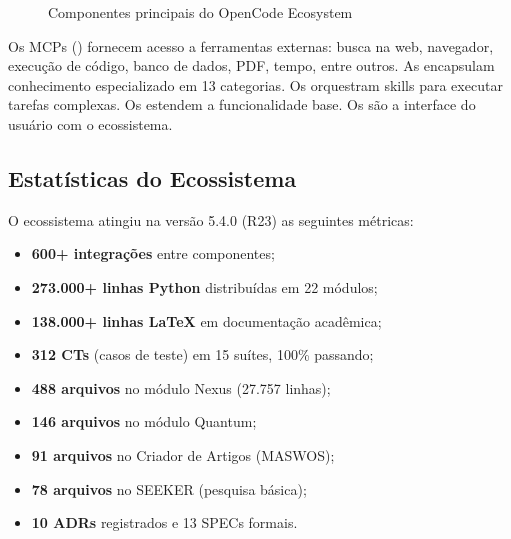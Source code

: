 \begin{figure}[htb]
\centering
\caption{Componentes principais do OpenCode Ecosystem}
\label{fig:componentes-ecossistema}
\end{figure}

Os MCPs () fornecem acesso a ferramentas
externas: busca na web, navegador, execução de código, banco de dados,
PDF, tempo, entre outros. As  encapsulam conhecimento
especializado em 13 categorias. Os  orquestram skills
para executar tarefas complexas. Os  estendem a
funcionalidade base. Os  são a interface do usuário
com o ecossistema.

\subsection{Estatísticas do Ecossistema}
\label{subsec:estatisticas}

O ecossistema atingiu na versão 5.4.0 (R23) as seguintes métricas:

\begin{itemize}
\item \textbf{600+ integrações} entre componentes;
\item \textbf{273.000+ linhas Python} distribuídas em 22 módulos;
\item \textbf{138.000+ linhas LaTeX} em documentação acadêmica;
\item \textbf{312 CTs} (casos de teste) em 15 suítes, 100\% passando;
\item \textbf{488 arquivos} no módulo Nexus (27.757 linhas);
\item \textbf{146 arquivos} no módulo Quantum;
\item \textbf{91 arquivos} no Criador de Artigos (MASWOS);
\item \textbf{78 arquivos} no SEEKER (pesquisa básica);
\item \textbf{10 ADRs} registrados e 13 SPECs formais.
\end{itemize}

